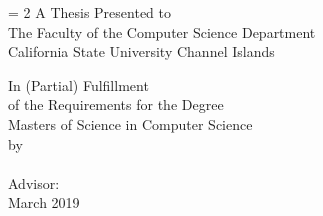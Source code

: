 \begin{titlepage}
\begin{center}
{\Large \bfseries \thesistitle \par}

\baselineskip = 2\baselineskip
A Thesis Presented to \\
The Faculty of the Computer Science Department\\
California State University Channel Islands
\vspace{0.5 cm}

In (Partial) Fulfillment\\
of the Requirements for the Degree\\
Masters of Science in Computer Science\\

by \\
\studentname\\
Advisor: \advisorname\\
March 2019
\end{center}
\end{titlepage}